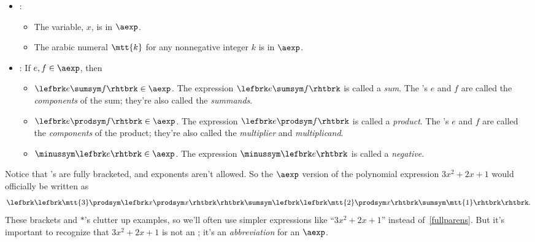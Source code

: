 \begin{definition} \mbox{}

\begin{itemize}
\item {}: \mbox{}

\begin{itemize}

\item The variable, $x$, is in $\aexp$.

\item The arabic numeral $\mtt{k}$ for any nonnegative integer $k$ is
  in $\aexp$.

\end{itemize}

\item {}: If $e,f \in \aexp$, then
\begin{itemize}
\setcounter{enumi}{2}

\item $\lefbrk e \sumsym f \rhtbrk \in \aexp$.  The expression $\lefbrk e \sumsym
  f \rhtbrk$ is called a \emph{sum}.  The \aexp's $e$ and $f$ are called the
  \emph{components} of the sum; they're also called the \emph{summands}.

\item $\lefbrk e \prodsym f\rhtbrk \in \aexp$.  The expression $\lefbrk e \prodsym f\rhtbrk$ is called a
  \emph{product}.  The \aexp's $e$ and $f$ are called the
  \emph{components} of the product; they're also called the
  \emph{multiplier} and \emph{multiplicand}.

\item $\minussym\lefbrk e\rhtbrk \in \aexp$.  The expression $\minussym\lefbrk e\rhtbrk$ is called a
  \emph{negative}.
\end{itemize}
\end{itemize}
\end{definition}

Notice that \aexp's are fully bracketed, and exponents aren't allowed.  So
the $\aexp$ version of the polynomial expression $3x^2 + 2x + 1$ would
officially be written as
\begin{equation}\label{fullparens}
\lefbrk \lefbrk \mtt{3} \prodsym \lefbrk x \prodsym x\rhtbrk\rhtbrk \sumsym \lefbrk \lefbrk \mtt{2} \prodsym x\rhtbrk \sumsym \mtt{1}\rhtbrk\rhtbrk.
\end{equation}
These brackets and $\ast$'s clutter up examples, so we'll often use
simpler expressions like ``$3x^2 + 2x + 1$'' instead
of~\eqref{fullparens}.  But it's important to recognize that $3x^2 +
2x + 1$ is not an \aexp; it's an \emph{abbreviation} for an $\aexp$.

